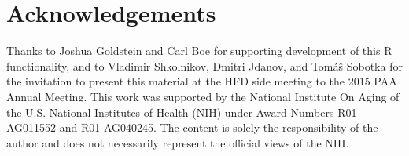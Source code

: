 \documentclass{article}
\begin{document}
\section{Acknowledgements}
Thanks to Joshua Goldstein and Carl Boe for supporting development of this R
functionality, and to Vladimir Shkolnikov, Dmitri Jdanov, and Tom\'{a}\^{s}
Sobotka for the invitation to present this material at the HFD side meeting to
the 2015 PAA Annual Meeting.
This work was supported by the National Institute On Aging of the U.S. National Institutes of Health (NIH) under Award Numbers R01-AG011552 and R01-AG040245. The content is solely the responsibility of the
author and does not necessarily represent the official views of the NIH.


   
\end{document}

